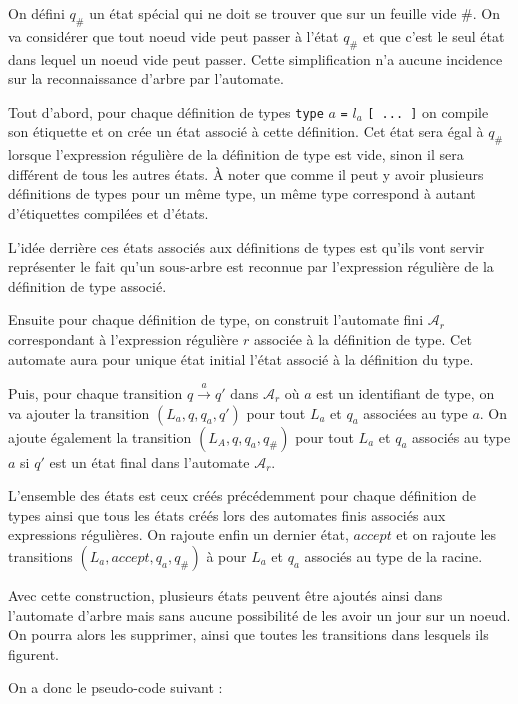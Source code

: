 \documentclass[a4paper, 11pt]{article}
\begin{document}
On défini $q_\#$ un état spécial qui ne doit se trouver que sur un feuille vide
$\#$. On va considérer que tout noeud vide peut passer à l'état $q_\#$ et que
c'est le seul état dans lequel un noeud vide peut passer. Cette simplification
n'a aucune incidence sur la reconnaissance d'arbre par l'automate.

Tout d'abord, pour chaque définition de types \texttt{type} $a$ \texttt{=} $l_a$
\texttt{[ ... ]} on compile son étiquette et on crée un état associé à cette
définition. Cet état sera égal à $q_\#$ lorsque l'expression régulière de la
définition de type est vide, sinon il sera différent de tous les autres états. À
noter que comme il peut y avoir plusieurs définitions de types pour un même
type, un même type correspond à autant d'étiquettes compilées et d'états.

L'idée derrière ces états associés aux définitions de types est qu'ils vont
servir représenter le fait qu'un sous-arbre est reconnue par l'expression
régulière de la définition de type associé.

Ensuite pour chaque définition de type, on construit l'automate fini
$\mathcal{A}_r$ correspondant à l'expression régulière $r$ associée à la
définition de type. Cet automate aura pour unique état initial l'état associé à
la définition du type.

Puis, pour chaque transition $q \xrightarrow{a} q'$ dans $\mathcal{A}_r$ où $a$
est un identifiant de type, on va ajouter la transition $(L_a, q, q_a, q')$ pour
tout $L_a$ et $q_a$ associées au type $a$. On ajoute également la transition
$(L_A, q, q_a, q_\#)$ pour tout $L_a$ et $q_a$ associés au type $a$ si $q'$ est
un état final dans l'automate $\mathcal{A}_r$.

L'ensemble des états est ceux créés précédemment pour chaque définition de types
ainsi que tous les états créés lors des automates finis associés aux expressions
régulières. On rajoute enfin un dernier état, $accept$ et on rajoute les
transitions $(L_a, accept, q_a, q_\#)$ à pour $L_a$ et $q_a$ associés au type de
la racine.

Avec cette construction, plusieurs états peuvent être ajoutés ainsi dans
l'automate d'arbre mais sans aucune possibilité de les avoir un jour sur un
noeud. On pourra alors les supprimer, ainsi que toutes les transitions dans
lesquels ils figurent.

On a donc le pseudo-code suivant :
\end{document}
